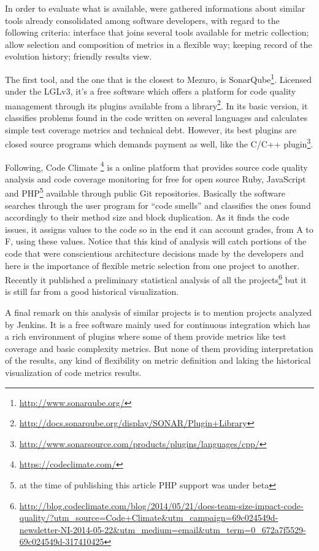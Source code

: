 In order to evaluate what is available, were gathered informations about similar tools already consolidated among software developers, with regard to the following criteria: interface that joins several tools available for metric collection; allow selection and composition of metrics in a flexible way; keeping record of the evolution history; friendly results view.

The first tool, and the one that is the closest to Mezuro, is SonarQube\footnote{\url{http://www.sonarqube.org/}}. Licensed under the LGLv3, it's a free software which offers a platform for code quality management through its plugins available from a library\footnote{\url{http://docs.sonarqube.org/display/SONAR/Plugin+Library}}. In its basic version, it classifies problems found in the code written on several languages and calculates simple test coverage metrics and technical debt. However, its best plugins are closed source programs which demands payment as well, like the C/C++ plugin\footnote{\url{http://www.sonarsource.com/products/plugins/languages/cpp/}}.

Following, Code Climate \footnote{\url{https://codeclimate.com/}} is a online platform that provides source code quality analysis and code coverage monitoring for free for open source Ruby, JavaScript and PHP\footnote{at the time of publishing this article PHP support was under beta} available through public Git repositories. Basically the software searches through the user program for ``code smells'' and classifies the ones found accordingly to their method size and block duplication. As it finds the code issues, it assigns values to the code so in the end it can account grades, from A to F, using these values. Notice that this kind of analysis will catch portions of the code that were conscientious architecture decisions made by the developers and here is the importance of flexible metric selection from one project to another. Recently it published a preliminary statistical analysis of all the projects\footnote{\url{http://blog.codeclimate.com/blog/2014/05/21/does-team-size-impact-code-quality/?utm_source=Code+Climate&utm_campaign=69c024549d-newsletter-NI-2014-05-22&utm_medium=email&utm_term=0_672a7f5529-69c024549d-317410425}} but it is still far from a good historical visualization.

A final remark on this analysis of similar projects is to mention projects analyzed by Jenkins. It is a free software mainly used for continuous integration which has a rich environment of plugins where some of them provide metrics like test coverage and basic complexity metrics. But none of them providing interpretation of the results, any kind of flexibility on metric definition and laking the historical visualization of code metrics results.
